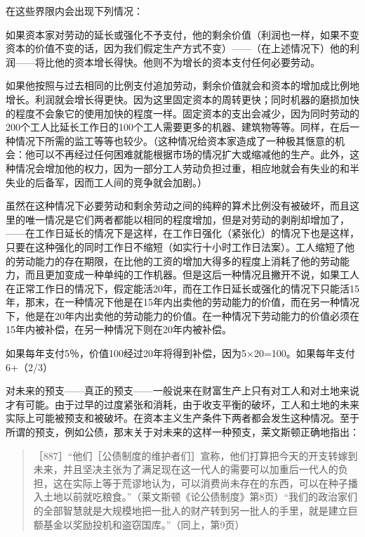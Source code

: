 在这些界限内会出现下列情况：

如果资本家对劳动的延长或强化不予支付，他的剩余价值（利润也一样，如果不变资本的价值不变的话，因为我们假定生产方式不变）——（在上述情况下）他的利润——将比他的资本增长得快。他则不为增长的资本支付任何必要劳动。

如果他按照与过去相同的比例支付追加劳动，剩余价值就会和资本的增加成比例地增长。利润就会增长得更快。因为这里固定资本的周转更快；同时机器的磨损加快的程度不会象它的使用加快的程度一样。固定资本的支出会减少，因为同时劳动的200个工人比延长工作日的100个工人需要更多的机器、建筑物等等。同样，在后一种情况下所需的监工等等也较少。（这种情况给资本家造成了一种极其惬意的机会：他可以不再经过任何困难就能根据市场的情况扩大或缩减他的生产。此外，这种情况会增加他的权力，因为一部分工人劳动负担过重，相应地就会有失业的和半失业的后备军，因而工人间的竞争就会加剧。）

虽然在这种情况下必要劳动和剩余劳动之间的纯粹的算术比例没有被破坏，而且这里的唯一情况是它们两者都能以相同的程度增加，但是对劳动的剥削却增加了，——在工作日延长的情况下是这样，在工作日强化（紧张化）的情况下也是这样，只要在这种强化的同时工作日不缩短（如实行十小时工作日法案）。工人缩短了他的劳动能力的存在期限，在比他的工资的增加大得多的程度上消耗了他的劳动能力，而且更加变成一种单纯的工作机器。但是这后一种情况且撇开不说，如果工人在正常工作日的情况下，假定能活20年，而在工作日延长或强化的情况下只能活15年，那末，在一种情况下他是在15年内出卖他的劳动能力的价值，而在另一种情况下，他是在20年内出卖他的劳动能力的价值。在一种情况下劳动能力的价值必须在15年内被补偿，在另一种情况下则在20年内被补偿。

如果每年支付5％，价值100经过20年将得到补偿，因为5×20=100。如果每年支付6+（2/3）%

对未来的预支——真正的预支——一般说来在财富生产上只有对工人和对土地来说才有可能。由于过早的过度紧张和消耗，由于收支平衡的破坏，工人和土地的未来实际上可能被预支和被破坏。在资本主义生产条件下两者都会发生这种情况。至于所谓的预支，例如公债，那末关于对未来的这样一种预支，莱文斯顿正确地指出：

\begin{quote}{［887］“他们［公债制度的维护者们］宣称，他们打算把今天的开支转嫁到未来，并且坚决主张为了满足现在这一代人的需要可以加重后一代人的负担，这在实际上等于荒谬地认为，可以消费尚未存在的东西，可以在种子播入土地以前就吃粮食。”（莱文斯顿《论公债制度》第8页）“我们的政治家们的全部智慧就是大规模地把一批人的财产转到另一批人的手里，就是建立巨额基金以奖励投机和盗窃国库。”（同上，第9页）}\end{quote}

